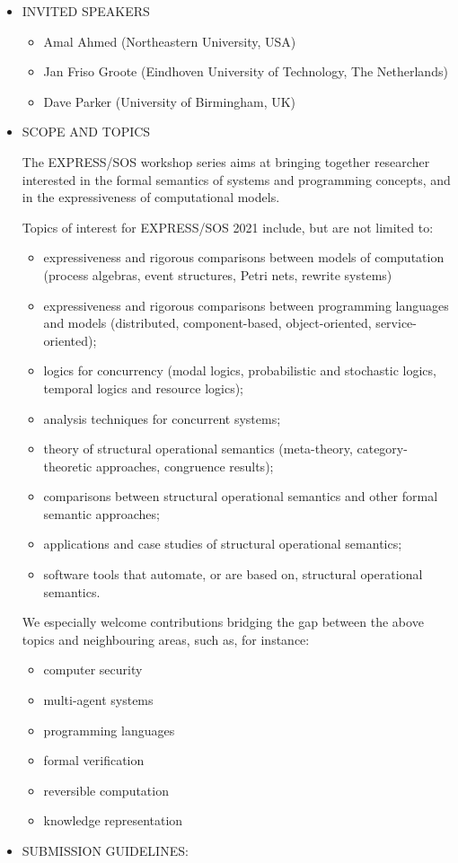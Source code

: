 \documentclass[prodmode,acmtecs]{acmsmall} %
\begin{document}
\begin{itemize}\item  INVITED SPEAKERS 
 
\begin{itemize}\item  Amal Ahmed (Northeastern University, USA)
\item  Jan Friso Groote (Eindhoven University of Technology, The Netherlands)
\item  Dave Parker (University of Birmingham, UK)
\end{itemize} 
\item  SCOPE AND TOPICS 
 
  The EXPRESS/SOS workshop series aims at bringing together researcher interested in the formal semantics of systems and programming concepts, and in the expressiveness of computational models. 
 
  Topics of interest for EXPRESS/SOS 2021 include, but are not limited to: 
 
\begin{itemize}\item  expressiveness and rigorous comparisons between models of computation (process algebras, event structures, Petri nets, rewrite systems)
\item  expressiveness and rigorous comparisons between programming languages and models (distributed, component-based, object-oriented, service-oriented);
\item  logics for concurrency (modal logics, probabilistic and stochastic logics, temporal logics and resource logics);
\item  analysis techniques for concurrent systems;
\item  theory of structural operational semantics (meta-theory, category-theoretic approaches, congruence results);
\item  comparisons between structural operational semantics and other formal semantic approaches;
\item  applications and case studies of structural operational semantics;
\item  software tools that automate, or are based on, structural operational semantics.
\end{itemize} 
  We especially welcome contributions bridging the gap between the above topics and neighbouring areas, such as, for instance: 
 
\begin{itemize}\item  computer security
\item  multi-agent systems
\item  programming languages
\item  formal verification
\item  reversible computation
\item  knowledge representation
\end{itemize} 
\item  SUBMISSION GUIDELINES: 
 

\end{itemize}
\end{document}
